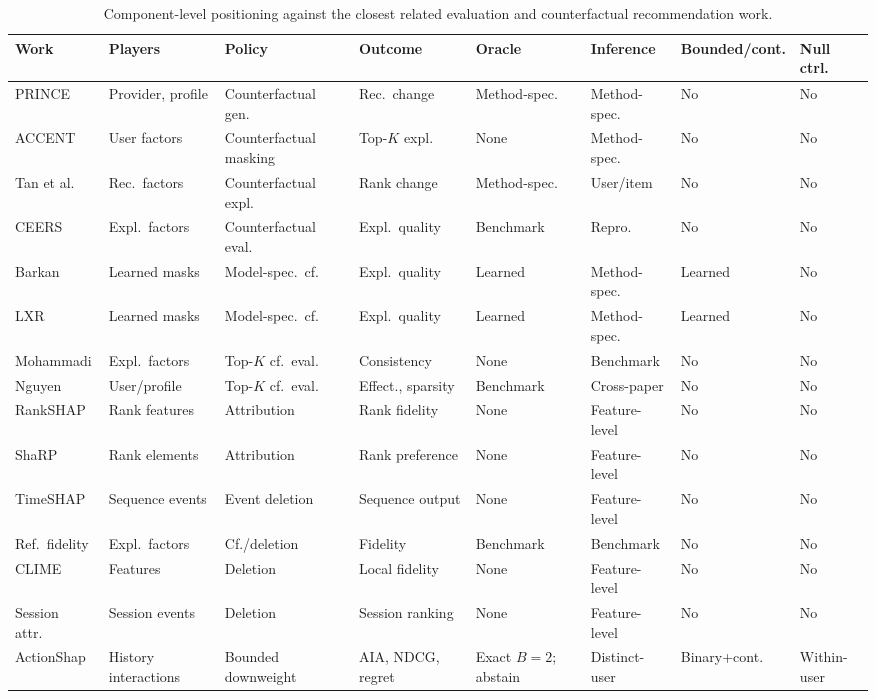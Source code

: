 \documentclass[a4paper,fleqn,doubleblind]{cas-sc}
\begin{document}
\begin{table}[t]
\centering\scriptsize
\caption{Component-level positioning against the closest related evaluation and counterfactual recommendation work.}
\label{tab:related-work-comparison}
\setlength{\tabcolsep}{2pt}
\begin{tabularx}{\linewidth}{@{}>{\raggedright\arraybackslash}p{.14\linewidth}*{7}{>{\raggedright\arraybackslash}X}@{}}
\toprule
Work & Players & Policy & Outcome & Oracle & Inference & Bounded/cont. & Null ctrl. \\
\midrule
PRINCE \cite{ghazimatin2020} & Provider, profile & Counterfactual gen. & Rec.\ change & Method-spec. & Method-spec. & No & No \\
ACCENT \cite{tran2021} & User factors & Counterfactual masking & Top-$K$ expl. & None & Method-spec. & No & No \\
Tan et al. \cite{tan2021} & Rec.\ factors & Counterfactual expl. & Rank change & Method-spec. & User/item & No & No \\
CEERS \cite{baklanov2024} & Expl.\ factors & Counterfactual eval. & Expl.\ quality & Benchmark & Repro. & No & No \\
Barkan \cite{barkan2024} & Learned masks & Model-spec.\ cf. & Expl.\ quality & Learned & Method-spec. & Learned & No \\
LXR \cite{gurevitch2025} & Learned masks & Model-spec.\ cf. & Expl.\ quality & Learned & Method-spec. & Learned & No \\
Mohammadi \cite{mohammadi2025} & Expl.\ factors & Top-$K$ cf.\ eval. & Consistency & None & Benchmark & No & No \\
Nguyen \cite{nguyen2026} & User/profile & Top-$K$ cf.\ eval. & Effect., sparsity & Benchmark & Cross-paper & No & No \\
RankSHAP \cite{chowdhury2024rankshap} & Rank features & Attribution & Rank fidelity & None & Feature-level & No & No \\
ShaRP \cite{pliatsika2025sharpl} & Rank elements & Attribution & Rank preference & None & Feature-level & No & No \\
TimeSHAP \cite{bento2021timeshap} & Sequence events & Event deletion & Sequence output & None & Feature-level & No & No \\
Ref.\ fidelity \cite{baklanov2025fidelity} & Expl.\ factors & Cf./deletion & Fidelity & Benchmark & Benchmark & No & No \\
CLIME \cite{mousavi2023clime} & Features & Deletion & Local fidelity & None & Feature-level & No & No \\
Session attr.\ \cite{bruun2025session} & Session events & Deletion & Session ranking & None & Feature-level & No & No \\
ActionShap & History interactions & Bounded downweight & AIA, NDCG, regret & Exact $B=2$; abstain & Distinct-user & Binary+cont. & Within-user \\
\bottomrule
\end{tabularx}
\end{table}
\end{document}
